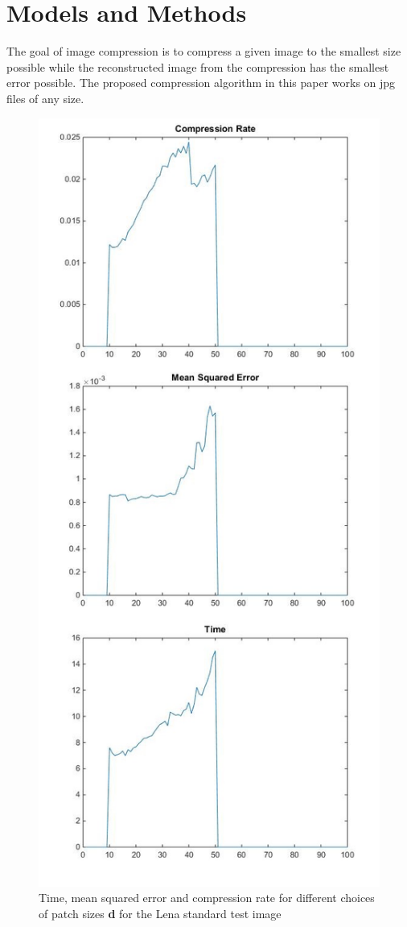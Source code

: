 \documentclass[10pt,conference,compsocconf]{IEEEtran}
\begin{document}
\section{Models and Methods}
The goal of image compression is to compress a given image to the smallest size possible while the reconstructed image from the compression has the smallest error possible. The proposed compression algorithm in this paper works on jpg files of any size.
\begin{figure}[h!]
\centering
  \includegraphics[scale=0.4]{figures/DsCombined2.jpg}
  \caption{Time, mean squared error and compression rate for different choices of patch sizes \textbf{d} for the Lena standard test image}
  \label{fig:DS}
\end{figure}
\end{document}
